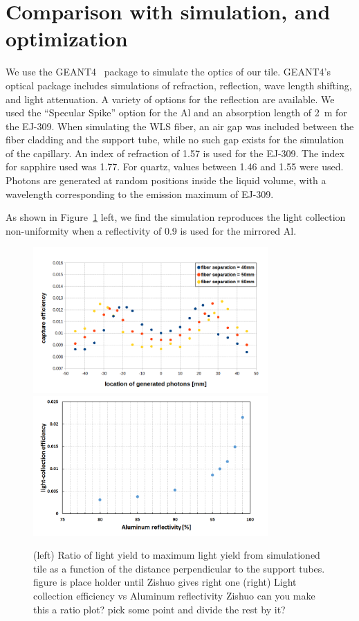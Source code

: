 \documentclass[review]{elsarticle}
\begin{document}
\section{Comparison with simulation, and optimization}
We use the GEANT4~\cite{Agostinelli2003250} package to simulate the
optics of our tile. GEANT4's optical package includes simulations of
refraction, reflection, wave length shifting, and light attenuation.
A variety of options for the reflection are available. We used the
``Specular Spike'' option for the Al and an absorption length of 2~m for
the EJ-309. When simulating the WLS fiber, an air gap was included
between the fiber cladding and the support tube, while no such gap
exists for the simulation of the capillary. An index of refraction of
1.57 is used for the EJ-309. The index for sapphire used was 1.77.
For quartz, values between 1.46 and 1.55 were used. Photons are
generated at random positions inside the liquid volume, with a
wavelength corresponding to the emission maximum of EJ-309.

As shown in Figure~\ref{fig:simeff} left, we find the simulation
reproduces the light collection non-uniformity when a reflectivity of
0.9 is used for the mirrored Al.

\begin{figure}[!ht]
\begin{center}
\includegraphics[width=0.8\textwidth]{./figures/geant_result_uniformity.png}
\includegraphics[width=0.8\textwidth]{./figures/geant_result_reflectivity.png}
\caption{(left) Ratio of light yield to maximum light yield from
  simulationed tile as a function of the distance perpendicular to the
  support tubes. {\color{red} figure is place holder until Zishuo
    gives right one} (right) Light collection efficiency vs Aluminum
  reflectivity {\color{red} Zishuo can you make this a ratio plot?
    pick some point and divide the rest by it?} }
\label{fig:simeff}
\end{center}
\end{figure}
\end{document}
